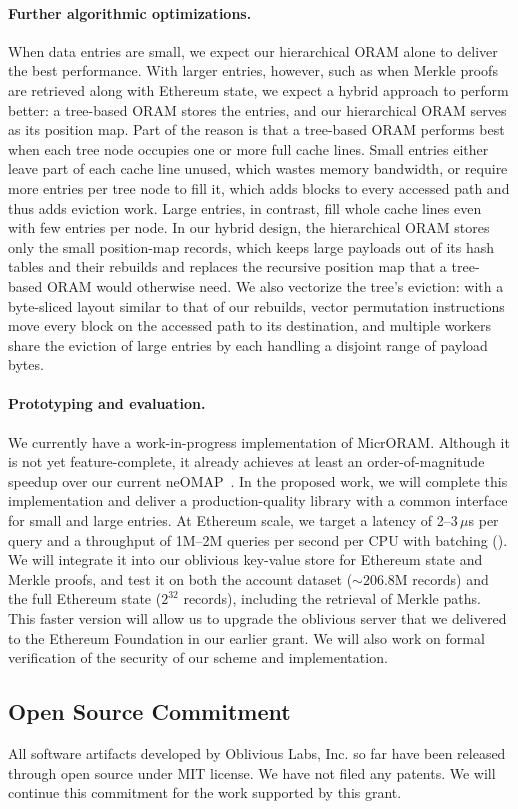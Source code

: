 \paragraph{Further algorithmic optimizations.}
When data entries are small, we expect our hierarchical ORAM alone to
deliver the best performance. With larger entries, however, such as when
Merkle proofs are retrieved along with Ethereum state, 
we expect a hybrid
approach to perform better: a tree-based ORAM stores the entries, and our
hierarchical ORAM serves as its position map. Part of the reason is that
a tree-based ORAM performs best when each tree node occupies one
or more full cache lines. Small entries either leave part of each cache
line unused, which wastes memory bandwidth, or require more entries per
tree node to fill it, which adds blocks to every accessed path and thus
adds eviction work. 
Large entries, in contrast, fill whole cache lines
even with few entries per node.
In our hybrid design, the hierarchical ORAM
stores only the small position-map records, which keeps large payloads
out of its hash tables and their rebuilds and replaces the recursive
position map that a tree-based ORAM would otherwise need. We also
vectorize the tree's eviction: with a byte-sliced layout similar to that
of our rebuilds, vector permutation instructions move every block on the
accessed path to its destination, and multiple workers share the eviction
of large entries by each handling a disjoint range of payload bytes. 

\paragraph{Prototyping and evaluation.}
We currently have a work-in-progress implementation of MicrORAM. Although
it is not yet feature-complete, it already achieves at least an
order-of-magnitude speedup over our current neOMAP~\cite{neomap}. In the
proposed work, we will complete this implementation and deliver a
production-quality library with a common interface for small and large
entries. At Ethereum scale, we target a latency of 2--3\,$\mu$s per query
and a throughput of 1M--2M queries per second per CPU with batching
(). We will integrate it into our oblivious key-value store for
Ethereum state and Merkle proofs, and test it on both the account dataset
(${\sim}206.8$M records) and the full Ethereum state ($2^{32}$ records),
including the retrieval of Merkle paths. This faster version will allow us
to upgrade the oblivious server that we delivered to the Ethereum
Foundation in our earlier grant. 
We will also work on formal verification of the security of our scheme
and implementation.

\subsection{Open Source Commitment}

All software artifacts developed by Oblivious Labs, Inc. so far
have been released through open source under MIT license.
We have not filed any patents.
We will continue this commitment for the work supported by this grant. 



